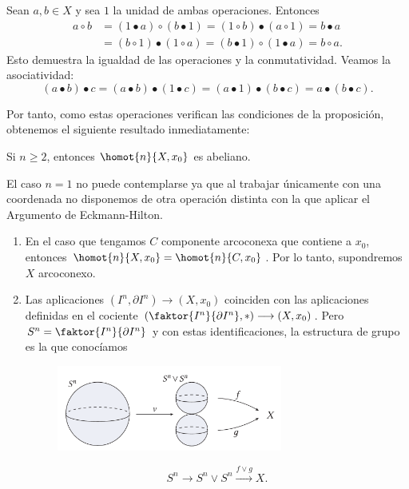 \begin{demo}
Sean $a,b \in X$ y sea $1$ la unidad de ambas operaciones. Entonces
\begin{align*}
a \circ b &= (1 \bullet a) \circ (b \bullet 1) = (1 \circ b) \bullet (a \circ 1) = b \bullet a  \\
&= (b \circ 1) \bullet (1 \circ a) = (b \bullet 1) \circ (1 \bullet a) = b \circ a.
\end{align*}
Esto demuestra la igualdad de las operaciones y la conmutatividad. Veamos la asociatividad:
\[
(a \bullet b) \bullet c = (a \bullet b) \bullet (1 \bullet c) = (a \bullet 1) \bullet (b \bullet c) = a \bullet (b \bullet c).
\]
\end{demo}
Por tanto, como estas operaciones verifican las condiciones de la proposición, obtenemos el siguiente resultado inmediatamente:
\begin{teor}
Si $n \geq 2$, entonces $\homot{n}{X, x_0}$ es abeliano.
\end{teor}
El caso $n=1$ no puede contemplarse ya que al trabajar únicamente con una coordenada no disponemos de otra operación distinta con la que aplicar el Argumento de Eckmann-Hilton.
\begin{custom}[Observaciones]
\begin{enumerate}
\item En el caso que tengamos $C$ componente arcoconexa que contiene a $x_0$, entonces $\homot{n}{X, x_0} = \homot{n}{C, x_0}$. Por lo tanto, supondremos $X$ arcoconexo.

\item Las aplicaciones $ (I^n, \partial I^n) \longrightarrow (X, x_0)$ coinciden con las aplicaciones definidas en el cociente $(\faktor{I^n}{\partial I^n}, \ast) \longrightarrow (X, x_0)$. Pero $S^n = \faktor{I^n}{\partial I^n}$ y con estas identificaciones, la estructura de grupo es la que conocíamos \par
\begin{figure}[h]
\centering
\includegraphics[width = 0.7\textwidth]{images/ejgruphomot}
\end{figure}
\[S^n \longrightarrow S^n \vee S^n \stackrel{f \vee g}{\longrightarrow} X. \]
\end{enumerate}
\end{custom}
